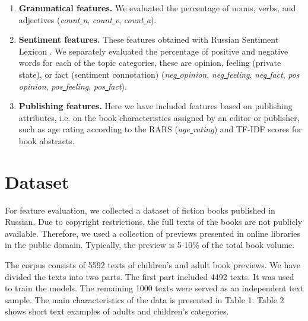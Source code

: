 \documentclass[runningheads]{llncs}
\begin{document}
\begin{enumerate}
\begin{itemize}
    \end{itemize}
    \item
    \textbf{Grammatical features.} We evaluated the percentage of nouns, verbs, and adjectives (\textit{count\underline{ }n}, \textit{count\underline{ }v}, \textit{count\underline{ }a}).
    \item
    \textbf{Sentiment features.} These features obtained with Russian Sentiment Lexicon \cite{Loukashevich}. We separately evaluated the percentage of positive and negative words for each of the topic categories, these are opinion, feeling (private state), or fact (sentiment connotation) (\textit{neg\underline{ }opinion}, \textit{neg\underline{ }feeling}, \textit{neg\underline{ }fact}, \textit{pos\underline{ }opinion}, \textit{pos\underline{ }feeling}, \textit{pos\underline{ }fact}).
    \item
    \textbf{Publishing features.} Here we have included features based on publishing attributes, i.e. on the book characteristics assigned by an editor or publisher, such as age rating according to the RARS (\textit{age\underline{ }rating}) and TF-IDF scores for book abstracts.
\end{enumerate}

\section{Dataset}

For feature evaluation, we collected a dataset of fiction books published in Russian. Due to copyright restrictions, the full texts of the books are not publicly available. Therefore, we used a collection of previews presented in online libraries in the public domain. Typically, the preview is 5-10\% of the total book volume.

The corpus consists of 5592 texts of children's and adult book previews. We have divided the texts into two parts. The first part included 4492 texts. It was used to train the models. The remaining 1000 texts were served as an independent text sample. The main characteristics of the data is presented in Table 1. Table 2 shows short text examples of adults and children's categories.
\end{document}
